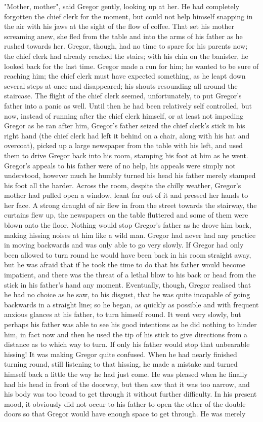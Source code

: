 "Mother, mother", said Gregor gently, looking up at her. He had completely forgotten the chief clerk for the moment, but could not help himself snapping in the air with his jaws at the sight of the flow of coffee. That set his mother screaming anew, she fled from the table and into the arms of his father as he rushed towards her. Gregor, though, had no time to spare for his parents now; the chief clerk had already reached the stairs; with his chin on the banister, he looked back for the last time. Gregor made a run for him; he wanted to be sure of reaching him; the chief clerk must have expected something, as he leapt down several steps at once and disappeared; his shouts resounding all around the staircase. The flight of the chief clerk seemed, unfortunately, to put Gregor's father into a panic as well. Until then he had been relatively self controlled, but now, instead of running after the chief clerk himself, or at least not impeding Gregor as he ran after him, Gregor's father seized the chief clerk's stick in his right hand (the chief clerk had left it behind on a chair, along with his hat and overcoat), picked up a large newspaper from the table with his left, and used them to drive Gregor back into his room, stamping his foot at him as he went. Gregor's appeals to his father were of no help, his appeals were simply not understood, however much he humbly turned his head his father merely stamped his foot all the harder. Across the room, despite the chilly weather, Gregor's mother had pulled open a window, leant far out of it and pressed her hands to her face. A strong draught of air flew in from the street towards the stairway, the curtains flew up, the newspapers on the table fluttered and some of them were blown onto the floor. Nothing would stop Gregor's father as he drove him back, making hissing noises at him like a wild man. Gregor had never had any practice in moving backwards and was only able to go very slowly. If Gregor had only been allowed to turn round he would have been back in his room straight away, but he was afraid that if he took the time to do that his father would become impatient, and there was the threat of a lethal blow to his back or head from the stick in his father's hand any moment. Eventually, though, Gregor realised that he had no choice as he saw, to his disgust, that he was quite incapable of going backwards in a straight line; so he began, as quickly as possible and with frequent anxious glances at his father, to turn himself round. It went very slowly, but perhaps his father was able to see his good intentions as he did nothing to hinder him, in fact now and then he used the tip of his stick to give directions from a distance as to which way to turn. If only his father would stop that unbearable hissing! It was making Gregor quite confused. When he had nearly finished turning round, still listening to that hissing, he made a mistake and turned himself back a little the way he had just come. He was pleased when he finally had his head in front of the doorway, but then saw that it was too narrow, and his body was too broad to get through it without further difficulty. In his present mood, it obviously did not occur to his father to open the other of the double doors so that Gregor would have enough space to get through. He was merely 